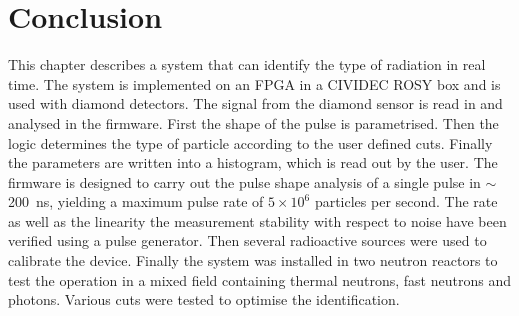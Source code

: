 \documentclass[12pt]{packages/mytustyle}  %
\begin{document}
\section{Conclusion}
\label{sec:conclcurrent}
This chapter describes a system that can identify the type of radiation in real time. The system is implemented on an FPGA in a CIVIDEC ROSY box and is used with diamond detectors. The signal from the diamond sensor is read in and analysed in the firmware. First the shape of the pulse is parametrised. Then the logic determines the type of particle according to the user defined cuts. Finally the parameters are written into a histogram, which is read out by the user. The firmware is designed to carry out the pulse shape analysis of a single pulse in $\sim$200~ns, yielding a maximum pulse rate of $5\times10^6$ particles per second. The rate as well as the linearity the measurement stability with respect to noise have been verified using a pulse generator. Then several radioactive sources were used to calibrate the device. Finally the system was installed in two neutron reactors to test the operation in a mixed field containing thermal neutrons, fast neutrons and photons. Various cuts were tested to optimise the identification.










\end{document}
